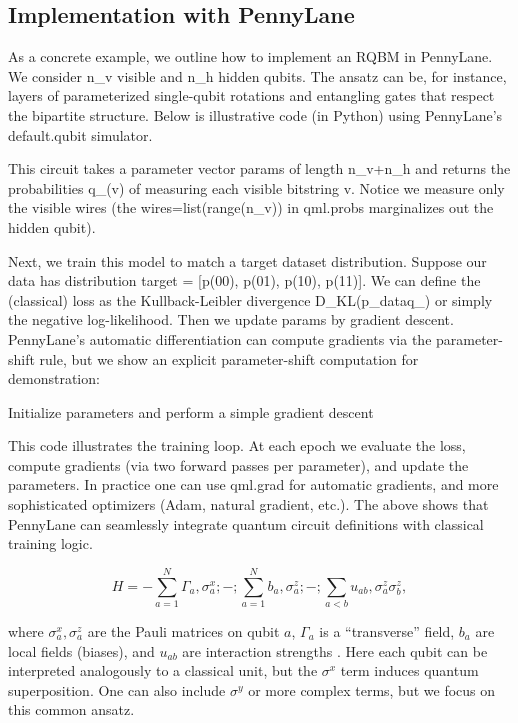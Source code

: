 \documentclass[%
oneside,                 %
final,                   %
10pt]{article}
\begin{document}
\subsection{Implementation with PennyLane}

As a concrete example, we outline how to implement an RQBM in
PennyLane. We consider n_v visible and n_h hidden qubits. The ansatz
can be, for instance, layers of parameterized single-qubit rotations
and entangling gates that respect the bipartite structure.  Below is
illustrative code (in Python) using PennyLane’s default.qubit
simulator.



This circuit takes a parameter vector params of length n_v+n_h and
returns the probabilities q_\theta(v) of measuring each visible
bitstring v.  Notice we measure only the visible wires (the
wires=list(range(n_v)) in qml.probs marginalizes out the hidden
qubit).

Next, we train this model to match a target dataset distribution.
Suppose our data has distribution target = [p(00), p(01), p(10),
p(11)].  We can define the (classical) loss as the Kullback-Leibler
divergence D_{\rm KL}(p_{\rm data}\Vert q_\theta) or simply the
negative log-likelihood.  Then we update params by gradient descent.
PennyLane’s automatic differentiation can compute gradients via the
parameter-shift rule, but we show an explicit parameter-shift
computation for demonstration:



\bpycod
Initialize parameters and perform a simple gradient descent

\epycod


This code illustrates the training loop.  At each epoch we evaluate
the loss, compute gradients (via two forward passes per parameter),
and update the parameters.  In practice one can use qml.grad for
automatic gradients, and more sophisticated optimizers (Adam, natural
gradient, etc.). The above shows that PennyLane can seamlessly
integrate quantum circuit definitions with classical training logic.

\[
H = -\sum_{a=1}^N \Gamma_a,\sigma^x_a ;-;\sum_{a=1}^N b_a,\sigma^z_a ;-;\sum_{a<b} u_{ab},\sigma^z_a \sigma^z_b,
\]

where $\sigma_a^x,\sigma_a^z$ are the Pauli matrices on qubit $a$,
$\Gamma_a$ is a “transverse” field, $b_a$ are local fields (biases),
and $u_{ab}$ are interaction strengths .  Here each qubit can be
interpreted analogously to a classical unit, but the $\sigma^x$ term
induces quantum superposition.  One can also include $\sigma^y$ or
more complex terms, but we focus on this common ansatz.
\end{document}
